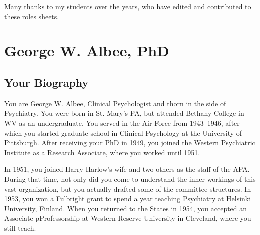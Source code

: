 \begin{refsection}
\def\mysubtitle{The struggle for legitimacy of psychology and psychiatry in the 1970’s\\ \large Role Sheets}

\maketitle
\newpage
\startcontents[rolesheets]

\listoftheorems[ignoreall,show={mycommittees,myassign,myresearch,myproposal}]


\renewcommand*{\thechapter}{\arabic{chapter}}
\setcounter{chapter}{0}
\mainmatter

Many thanks to my students over the years, who have edited and contributed to these roles sheets.

\chapter{George W. Albee, PhD}
\label{georgew.albeephd}

\section{Your Biography}
\label{yourbiography}

You are George W. Albee, Clinical Psychologist and thorn in the side of Psychiatry. You were born in St. Mary's PA, but attended Bethany College in WV as an undergraduate. You served in the Air Force from 1943--1946, after which you started graduate school in Clinical Psychology at the University of Pittsburgh. After receiving your PhD in 1949, you joined the Western Psychiatric Institute as a Research Associate, where you worked until 1951.

In 1951, you joined Harry Harlow's wife and two others as the staff of the APA. During that time, not only did you come to understand the inner workings of this vast organization, but you actually drafted some of the committee structures. In 1953, you won a Fulbright grant to spend a year teaching Psychiatry at Helsinki University, Finland. When you returned to the States in 1954, you accepted an Associate pProfessorship at Western Reserve University in Cleveland, where you still teach.


\end{refsection}

